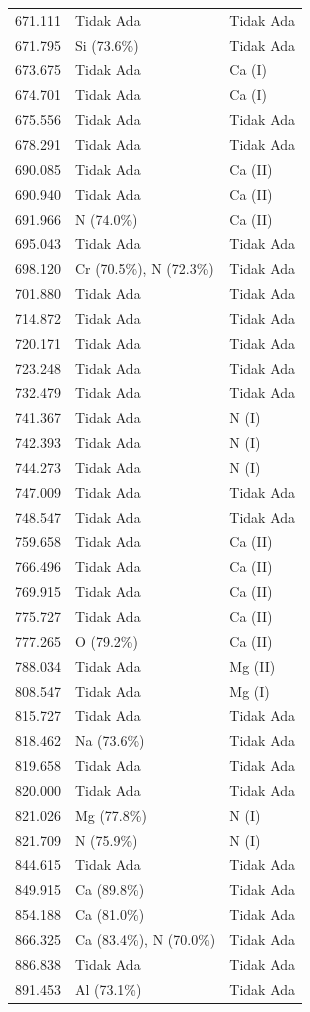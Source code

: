 \begin{onehalfspace}
\begin{longtable}{p{} p{} p{}}
    671.111 & Tidak Ada & Tidak Ada \\
    671.795 & Si (73.6\%) & Tidak Ada \\
    673.675 & Tidak Ada & Ca (I) \\
    674.701 & Tidak Ada & Ca (I) \\
    675.556 & Tidak Ada & Tidak Ada \\
    678.291 & Tidak Ada & Tidak Ada \\
    690.085 & Tidak Ada & Ca (II) \\
    690.940 & Tidak Ada & Ca (II) \\
    691.966 & N (74.0\%) & Ca (II) \\
    695.043 & Tidak Ada & Tidak Ada \\
    698.120 & Cr (70.5\%), N (72.3\%) & Tidak Ada \\
    701.880 & Tidak Ada & Tidak Ada \\
    714.872 & Tidak Ada & Tidak Ada \\
    720.171 & Tidak Ada & Tidak Ada \\
    723.248 & Tidak Ada & Tidak Ada \\
    732.479 & Tidak Ada & Tidak Ada \\
    741.367 & Tidak Ada & N (I) \\
    742.393 & Tidak Ada & N (I) \\
    744.273 & Tidak Ada & N (I) \\
    747.009 & Tidak Ada & Tidak Ada \\
    748.547 & Tidak Ada & Tidak Ada \\
    759.658 & Tidak Ada & Ca (II) \\
    766.496 & Tidak Ada & Ca (II) \\
    769.915 & Tidak Ada & Ca (II) \\
    775.727 & Tidak Ada & Ca (II) \\
    777.265 & O (79.2\%) & Ca (II) \\
    788.034 & Tidak Ada & Mg (II) \\
    808.547 & Tidak Ada & Mg (I) \\
    815.727 & Tidak Ada & Tidak Ada \\
    818.462 & Na (73.6\%) & Tidak Ada \\
    819.658 & Tidak Ada & Tidak Ada \\
    820.000 & Tidak Ada & Tidak Ada \\
    821.026 & Mg (77.8\%) & N (I) \\
    821.709 & N (75.9\%) & N (I) \\
    844.615 & Tidak Ada & Tidak Ada \\
    849.915 & Ca (89.8\%) & Tidak Ada \\
    854.188 & Ca (81.0\%) & Tidak Ada \\
    866.325 & Ca (83.4\%), N (70.0\%) & Tidak Ada \\
    886.838 & Tidak Ada & Tidak Ada \\
    891.453 & Al (73.1\%) & Tidak Ada \\


\end{longtable}
\end{onehalfspace}
